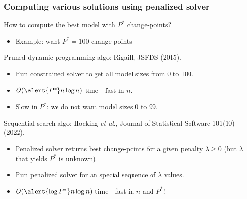 \documentclass{beamer}
\begin{document}
\begin{frame}
  \frametitle{Computing various solutions using penalized solver}

  How to compute the best model with $P^*$ change-points? 

  \begin{itemize}
  \item Example: want $P^*=100$ change-points.
  \end{itemize}

  Pruned dynamic programming algo: Rigaill, JSFDS (2015).
  \begin{itemize}
  \item Run \alert{constrained} solver to get all model sizes from 0 to 100.
  \item $O(\alert{P^*} n\log n)$ time---fast in $n$.
  \item Slow in $P^*$: we do not want model sizes 0 to 99.
  \end{itemize}

  Sequential search algo: Hocking \emph{et al.}, Journal of Statistical Software 101(10) (2022).
  \begin{itemize}
  \item Penalized solver returns best change-points for a given
    penalty $\lambda\geq 0$ (but $\lambda$ that yields $P^*$ is
    unknown).
  \item Run \alert{penalized} solver for an special sequence of $\lambda$ values.
  \item $O(\alert{\log P^*} n\log n)$ time---fast in $n$ and $P^*$!
  \end{itemize}
\end{frame}
\end{document}
